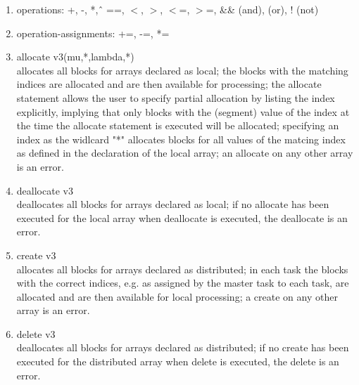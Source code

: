 \documentclass[12pt]{article}
\begin{document}
\begin{enumerate} 

\item operations: +, -, *, \^\, ==, $<$, $>$, $<$=, $>$=, \&\& (and), 
         \vline\hspace{1mm}\vline \hspace{1mm} (or), ! (not)

\item operation-assignments: +=, -=, *=

\item allocate v3(mu,*,lambda,*)\\ 
allocates all blocks for arrays declared as local; the blocks with the matching indices are 
allocated and are then available for processing; the allocate statement allows the user to 
specify partial allocation by listing the index explicitly, implying that only blocks 
with the (segment) value of the index at the time the allocate statement is executed will 
be allocated; specifying an index as the widlcard "*" allocates blocks for all values of the 
matcing index as defined in the declaration of the local array; an allocate on any other 
array is an error.

\item deallocate v3\\ 
deallocates all blocks for arrays declared as local; if no allocate has been executed for the 
local array when deallocate is executed, the deallocate is an error.

\item create v3\\ 
allocates all blocks for arrays declared as distributed; in each task the blocks with the 
correct indices, e.g. as assigned by the master task to each task, are allocated and are 
then available for local processing; a create on any other array is an error.

\item delete v3\\ 
deallocates all blocks for arrays declared as distributed; if no create has been executed 
for the distributed array when delete is executed, the delete is an error.


\end{enumerate}
\end{document}
